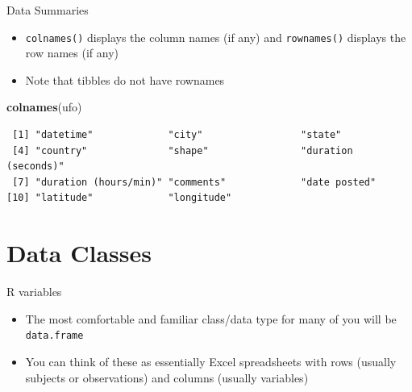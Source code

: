 \documentclass[
  ignorenonframetext,
]{beamer}
\newenvironment{Shaded}{\begin{snugshade}}{\end{snugshade}}
\newcommand{\KeywordTok}[1]{\textcolor[rgb]{0.13,0.29,0.53}{\textbf{#1}}}
\newcommand{\NormalTok}[1]{#1}
\providecommand{\tightlist}{%
  \setlength{\itemsep}{0pt}\setlength{\parskip}{0pt}}
\begin{document}
\begin{frame}[fragile]{Data Summaries}
\protect\hypertarget{data-summaries-1}{}

\begin{itemize}
\tightlist
\item
  \texttt{colnames()} displays the column names (if any) and
  \texttt{rownames()} displays the row names (if any)
\item
  Note that tibbles do not have rownames
\end{itemize}

\begin{Shaded}
\begin{Highlighting}[]
\KeywordTok{colnames}\NormalTok{(ufo)}
\end{Highlighting}
\end{Shaded}

\begin{verbatim}
 [1] "datetime"             "city"                 "state"               
 [4] "country"              "shape"                "duration (seconds)"  
 [7] "duration (hours/min)" "comments"             "date posted"         
[10] "latitude"             "longitude"           
\end{verbatim}

\end{frame}

\hypertarget{data-classes}{%
\section{Data Classes}\label{data-classes}}

\begin{frame}[fragile]{R variables}
\protect\hypertarget{r-variables}{}

\begin{itemize}
\tightlist
\item
  The most comfortable and familiar class/data type for many of you will
  be \texttt{data.frame}
\item
  You can think of these as essentially Excel spreadsheets with rows
  (usually subjects or observations) and columns (usually variables)
\end{itemize}

\end{frame}
\end{document}
